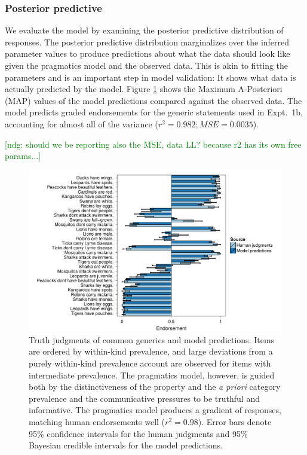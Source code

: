 \documentclass[10pt,letterpaper]{article}
\newcommand{\ndg}[1]{\textcolor{Green}{[ndg: #1]}}
\begin{document}
\subsubsection{Posterior predictive}

We evaluate the model by examining the posterior predictive distribution of responses. 
The posterior predictive distribution marginalizes over the inferred parameter values to produce predictions about what the data should look like given the pragmatics model and the observed data. 
This is akin to fitting the parameters and is an important step in model validation: It shows what data is actually predicted by the model. 
Figure \ref{fig:tj1b} shows the Maximum A-Posteriori (MAP) values of the model predictions compared against the observed data. 
The model predicts graded endorsements for the generic statements used in Expt.~1b, accounting for almost all of the variance ($r^2 = 0.982; MSE=0.0035 $). 

\ndg{should we be reporting also the MSE, data LL? because r2 has its own free params...}

\begin{figure}
\centering
    \includegraphics[width=\columnwidth]{tj_n100-postPred-byItem.pdf}
    \caption{Truth judgments of common generics and model predictions. 
Items are ordered by within-kind prevalence, and large deviations from a purely within-kind prevalence account are observed for items with intermediate prevalence. 
The pragmatics model, however, is guided both by the distinctiveness of the property and the \emph{a priori} category prevalence and the communicative pressures to be truthful and informative.
The pragmatics model produces a gradient of responses, matching human endorsements well ($r^2 = 0.98$).
Error bars denote 95\% confidence intervals for the human judgments and 95\% Bayesian credible intervals for the model predictions.}
  \label{fig:tj1b}
\end{figure}
\end{document}
